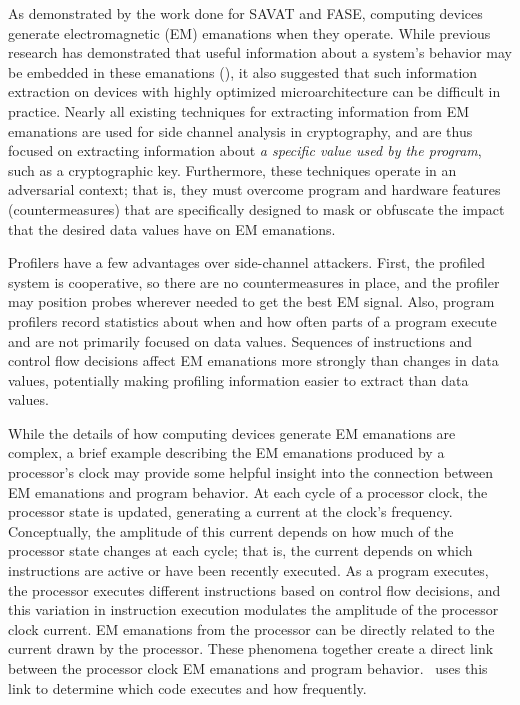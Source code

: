 

As demonstrated by the work done for SAVAT and FASE, computing devices generate electromagnetic (EM) emanations when they operate. While previous research has demonstrated that useful information about a system's behavior may be embedded in these emanations (\eg \cite{Rao02a,genkin_2014,CALLAN2014}), it also suggested that such information extraction on devices with highly optimized microarchitecture can be difficult in practice. Nearly all existing techniques for extracting information from EM emanations are used for side channel analysis in cryptography, and are thus focused on extracting information about {\em a specific value used by the program}, such as a cryptographic key.  Furthermore, these techniques operate in an adversarial context; that is, they must overcome program and hardware features (countermeasures) that are specifically designed to mask or obfuscate the impact that the desired data values have on EM emanations.

Profilers have a few advantages over side-channel attackers. First, the profiled system is cooperative, so there are no countermeasures in place, and the profiler may position probes wherever needed to get the best EM signal. Also, program profilers record statistics about when and how often parts of a program execute and are not primarily focused on data values. Sequences of instructions and control flow decisions affect EM emanations more strongly than changes in data values, potentially making profiling information easier to extract than data values.

While the details of how computing devices generate EM emanations are complex, a brief example describing the EM emanations produced by a processor's clock may provide some helpful insight into the connection between EM emanations and program behavior. At each cycle of a processor clock, the processor state is updated, generating a current at the clock's frequency.  Conceptually, the amplitude of this current depends on how much of the processor state changes at each cycle; that is, the current depends on which instructions are active or have been recently executed.  As a program executes, the processor executes different instructions based on control flow decisions, and this variation in instruction execution modulates the amplitude of the processor clock current. EM emanations from the processor can be directly related to the current drawn by the processor. These phenomena together create a direct link between the processor clock EM emanations and program behavior. \zop\ uses this link to determine which code executes and how frequently.

